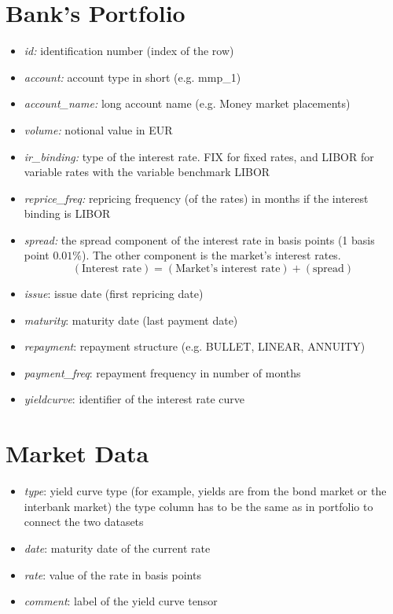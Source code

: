 \documentclass[11pt]{report}
\begin{document}
\section{Bank's Portfolio}
\begin{itemize}
	\item \textit{id:} identification number (index of the row)
	\item \textit{account:} account type in short (e.g. mmp\_1)
	\item \textit{account\_name:} long account name (e.g. Money market placements)
	\item \textit{volume:} notional value in EUR
	\item \textit{ir\_binding:} type of the interest rate. FIX for fixed rates, and LIBOR for variable rates with the variable benchmark LIBOR
	\item \textit{reprice\_freq:} repricing frequency (of the rates) in months if the interest binding is LIBOR
	\item \textit{spread:} the spread component of the interest rate in basis points (1 basis point $0.01\%$). The other component is the market's interest rates. $$(\text{Interest rate}) = (\text{Market's interest rate})+(\text{spread})$$
	\item \textit{issue}: issue date (first repricing date)
	\item \textit{maturity}: maturity date (last payment date)
	\item \textit{repayment}: repayment structure (e.g. BULLET, LINEAR, ANNUITY)
	\item \textit{payment\_freq}: repayment frequency in number of months
	\item \textit{yieldcurve}: identifier of the interest rate curve
\end{itemize}


\section{Market Data}

\begin{itemize}
	\item \textit{type}: yield curve type (for example, yields are from the bond market or the interbank market) the type column has to be the same as in portfolio to connect the two datasets
	\item \textit{date}: maturity date of the current rate
	\item \textit{rate}: value of the rate in basis points
	\item \textit{comment}: label of the yield curve tensor
\end{itemize}
\end{document}
